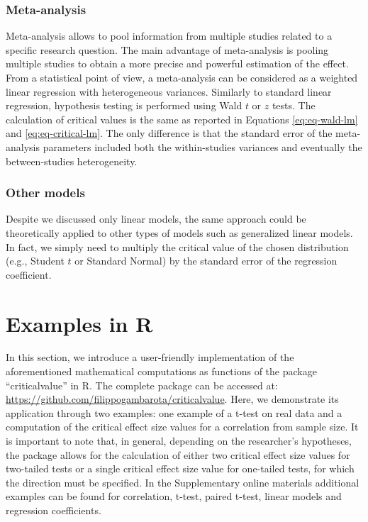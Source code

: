\documentclass[
  man]{apa7}
\begin{document}
\hypertarget{meta-analysis}{%
\subsubsection{Meta-analysis}\label{meta-analysis}}

Meta-analysis allows to pool information from multiple studies related to a specific research question. The main advantage of meta-analysis is pooling multiple studies to obtain a more precise and powerful estimation of the effect. From a statistical point of view, a meta-analysis can be considered as a weighted linear regression with heterogeneous variances. Similarly to standard linear regression, hypothesis testing is performed using Wald \(t\) or \(z\) tests. The calculation of critical values is the same as reported in Equations \eqref{eq:eq-wald-lm} and \eqref{eq:eq-critical-lm}. The only difference is that the standard error of the meta-analysis parameters included both the within-studies variances and eventually the between-studies heterogeneity.

\hypertarget{other-models}{%
\subsubsection{Other models}\label{other-models}}

Despite we discussed only linear models, the same approach could be theoretically applied to other types of models such as generalized linear models. In fact, we simply need to multiply the critical value of the chosen distribution (e.g., Student \(t\) or Standard Normal) by the standard error of the regression coefficient.

\hypertarget{examples-in-r}{%
\section{Examples in R}\label{examples-in-r}}

In this section, we introduce a user-friendly implementation of the aforementioned mathematical computations as functions of the package ``criticalvalue'' in R. The complete package can be accessed at: \url{https://github.com/filippogambarota/criticalvalue}. Here, we demonstrate its application through two examples: one example of a t-test on real data and a computation of the critical effect size values for a correlation from sample size. It is important to note that, in general, depending on the researcher's hypotheses, the package allows for the calculation of either two critical effect size values for two-tailed tests or a single critical effect size value for one-tailed tests, for which the direction must be specified. In the Supplementary online materials additional examples can be found for correlation, t-test, paired t-test, linear models and regression coefficients.
\end{document}
